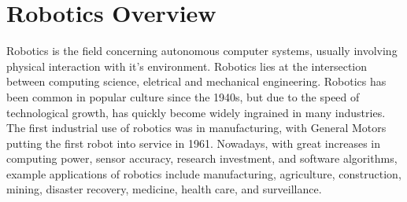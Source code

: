 \documentclass[../dissertation.tex]{subfiles}
\begin{document}
\section{Robotics Overview}
\label{background-robotics}






Robotics is the field concerning autonomous computer systems, usually involving physical interaction with it's environment. Robotics lies at the intersection between computing science, eletrical and mechanical engineering. Robotics has been common in popular culture since the 1940s\cite{hockstein2007history}, but due to the speed of technological growth, has quickly become widely ingrained in many industries. The first industrial use of robotics was in manufacturing, with General Motors putting the first robot into service in 1961\cite{hagele2016ashorthistory}. Nowadays, with great increases in computing power, sensor accuracy, research investment, and software algorithms, example applications of robotics include manufacturing, agriculture, construction, mining, disaster recovery, medicine, health care, and surveillance\cite{hagele2016robotsatwork}.
\end{document}
